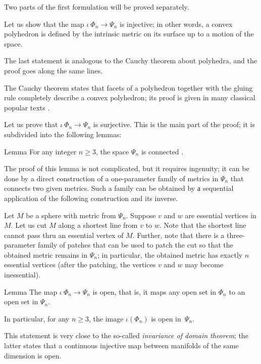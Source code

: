 \documentclass[oneside,a4paper]{article}
\begin{document}
\medskip

Two parts of the first formulation will be proved separately.

 Let us show that the map $\iota\:\Phi_n\to\Psi_n$ is injective;
in other words, a convex polyhedron is defined by the intrinsic metric on its surface up to a motion of the space.

The last statement is analogous to the Cauchy theorem about polyhedra,
and the proof goes along the same lines. 

The Cauchy theorem states that facets of a polyhedron together with the gluing rule completely describe a convex polyhedron;
its proof is given in many classical popular texts \cite{aigner-zigler,dolbilin,tabacnikov-fuks}.

\medskip

Let us prove that $\iota\:\Phi_n\to\Psi_n$ is surjective.
This is the main part of the proof;
it is subdivided into the following lemmas:

\begin{thm}{Lemma}
For any integer $n\ge 3$, the space $\Psi_n$ is connected .
\end{thm}

The proof of this lemma is not complicated, but it requires ingenuity;
it can be done by a direct construction of a one-parameter family of metrics in $\Psi_n$ that connects two given metrics.
Such a family can be obtained by а sequential application of the following construction and its inverse.

Let $M$ be a sphere with metric from $\Psi_n$.
Suppose $v$ and $w$ are essential vertices in $M$.
Let us cut $M$ along a shortest line from $v$ to $w$.
Note that the shortest line cannot pass thru an essential vertex of $M$.
Further, note that there is a three-parameter family of patches that can be used to patch the cut so that the obtained metric remains in $\Psi_n$;
in particular, the obtained metric has exactly $n$ essential vertices (after the patching, the vertices $v$ and $w$ may become inessential).


\begin{thm}{Lemma}
The map $\iota\:\Phi_n\to\Psi_n$ is open, 
that is, it maps any open set in $\Phi_n$ to an open set in $\Psi_n$.

In particular, for any $n\ge 3$, the image $\iota(\Phi_n)$ is open in~$\Psi_n$.
\end{thm}

This statement is very close to the so-called \emph{invariance of domain theorem};
the latter states that a continuous injective map between manifolds of the same dimension is open.
\end{document}
